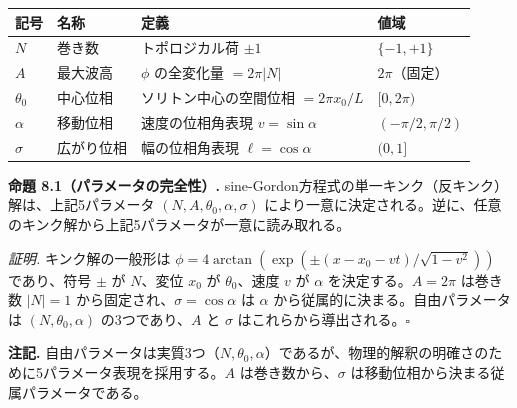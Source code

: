 \documentclass[a4paper,11pt]{ltjsarticle}
\newcounter{none}
\begin{document}
{\def\LTcaptype{none} %
\begin{longtable}[]{@{}
  >{\centering\arraybackslash}p{}
  >{\centering\arraybackslash}p{}
  >{\centering\arraybackslash}p{}
  >{\centering\arraybackslash}p{}@{}}
\toprule\noalign{}
\begin{minipage}[b]{\linewidth}\centering
記号
\end{minipage} & \begin{minipage}[b]{\linewidth}\centering
名称
\end{minipage} & \begin{minipage}[b]{\linewidth}\centering
定義
\end{minipage} & \begin{minipage}[b]{\linewidth}\centering
値域
\end{minipage} \\
\midrule\noalign{}
\endhead
\bottomrule\noalign{}
\endlastfoot
\(N\) & 巻き数 & トポロジカル荷 \(\pm 1\) & \(\{-1, +1\}\) \\
\(A\) & 最大波高 & \(\phi\) の全変化量 \(= 2\pi |N|\) &
\(2\pi\)（固定） \\
\(\theta_0\) & 中心位相 & ソリトン中心の空間位相 \(= 2\pi x_0 / L\) &
\([0, 2\pi)\) \\
\(\alpha\) & 移動位相 & 速度の位相角表現 \(v = \sin\alpha\) &
\((-\pi/2, \pi/2)\) \\
\(\sigma\) & 広がり位相 & 幅の位相角表現 \(\ell = \cos\alpha\) &
\((0, 1]\) \\
\end{longtable}
}

\textbf{命題 8.1（パラメータの完全性）.}
sine-Gordon方程式の単一キンク（反キンク）解は、上記5パラメータ
\((N, A, \theta_0, \alpha, \sigma)\)
により一意に決定される。逆に、任意のキンク解から上記5パラメータが一意に読み取れる。

\emph{証明.} キンク解の一般形は
\(\phi = 4\arctan(\exp(\pm(x - x_0 - vt)/\sqrt{1-v^2}))\) であり、符号
\(\pm\) が \(N\)、変位 \(x_0\) が \(\theta_0\)、速度 \(v\) が \(\alpha\)
を決定する。\(A = 2\pi\) は巻き数 \(|N| = 1\)
から固定され、\(\sigma = \cos\alpha\) は \(\alpha\)
から従属的に決まる。自由パラメータは \((N, \theta_0, \alpha)\)
の3つであり、\(A\) と \(\sigma\) はこれらから導出される。\(\square\)

\textbf{注記.}
自由パラメータは実質3つ（\(N, \theta_0, \alpha\)）であるが、物理的解釈の明確さのために5パラメータ表現を採用する。\(A\)
は巻き数から、\(\sigma\) は移動位相から決まる従属パラメータである。
\end{document}
